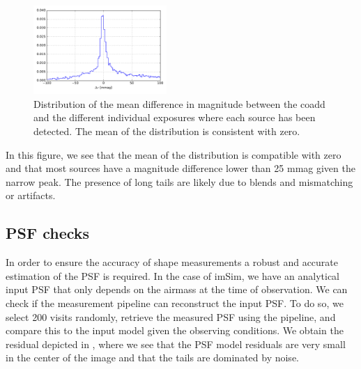 \documentclass[twocolumn]{aastex62}
\begin{document}
\begin{figure}
  \centering
  \includegraphics[width=0.45\textwidth]{photometry_internal_10visits_imsim_undithered}
  \caption{Distribution of the mean difference in magnitude between the coadd and the different individual exposures
  where each source has been detected. The mean of the distribution is consistent with zero.}
  \label{fig:internal_photometry_a}
\end{figure}

In this figure, we see that the mean of the distribution is compatible with zero and that most sources have a magnitude difference lower
than 25 mmag given the narrow peak. The presence of long tails are likely due to blends and mismatching or artifacts.

\subsection{PSF checks}
\label{sec:psf_checks}

In order to ensure the accuracy of shape measurements a robust and accurate estimation of the PSF is required. In the case of imSim, we have
an analytical input PSF that only depends on the airmass at the time of observation. We can check if the measurement pipeline can reconstruct
the input PSF. To do so, we select 200 visits randomly, retrieve the measured PSF using the pipeline, and compare this
to the input model given the observing conditions. We obtain the residual depicted in , where we see that the PSF model residuals are very small in the center of the image and that the tails are dominated by noise.
\end{document}
